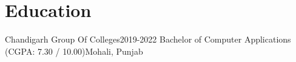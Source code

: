 \section{Education}
    \resumeSubHeadingListStart

    \resumeSubheading
    {Chandigarh Group Of Colleges}{2019-2022}
    {Bachelor of Computer Applications (CGPA: 7.30 / 10.00)}{Mohali, Punjab}
 
    \resumeSubHeadingListEnd